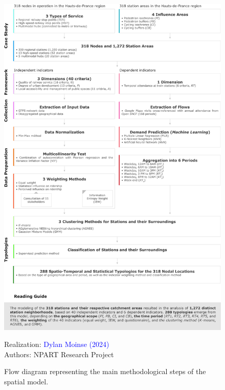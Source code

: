 \begin{refsegment}
\begin{figure}[h!]\vspace*{4pt}
    \caption{Flow diagram representing the main methodological steps of the spatial model.}
    \label{fig-chap6:schema-methodologie}
    \centerline{\includegraphics[width=1\columnwidth]{src/Figures/Chap-6/EN_NPART_Schema_Methodologie.pdf}}
    \vspace{5pt}
    \begin{flushright}\scriptsize{
    Realization: \textcolor{blue}{Dylan Moinse (2024)}
    \\
    Authors: \acrshort{NPART} Research Project
    }\end{flushright}
\end{figure}


\end{refsegment}
